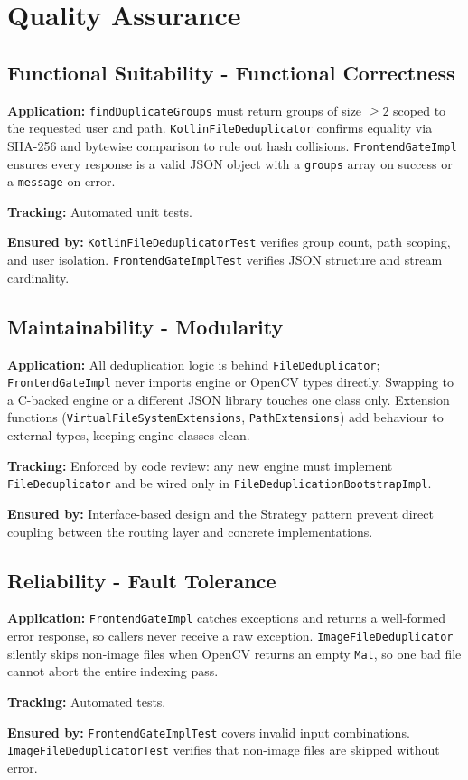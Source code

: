 \section{Quality Assurance}

\subsection{Functional Suitability - Functional Correctness}

\textbf{Application:}
\texttt{findDuplicateGroups} must return groups of size $\geq 2$ scoped to the requested user and path.
\texttt{KotlinFileDeduplicator} confirms equality via SHA-256 and bytewise comparison to rule out hash collisions.
\texttt{FrontendGateImpl} ensures every response is a valid JSON object with a \texttt{groups} array on success or a \texttt{message} on error.

\textbf{Tracking:} Automated unit tests.

\textbf{Ensured by:} \texttt{KotlinFileDeduplicatorTest} verifies group count, path scoping, and user isolation.
\texttt{FrontendGateImplTest} verifies JSON structure and stream cardinality.

\subsection{Maintainability - Modularity}

\textbf{Application:}
All deduplication logic is behind \texttt{FileDeduplicator}; \texttt{FrontendGateImpl} never imports engine or OpenCV types directly.
Swapping to a C-backed engine or a different JSON library touches one class only.
Extension functions (\texttt{VirtualFileSystemExtensions}, \texttt{PathExtensions}) add behaviour to external types, keeping engine classes clean.

\textbf{Tracking:} Enforced by code review: any new engine must implement \texttt{FileDeduplicator} and be wired only in \texttt{FileDeduplicationBootstrapImpl}.

\textbf{Ensured by:} Interface-based design and the Strategy pattern prevent direct coupling between the routing layer and concrete implementations.

\subsection{Reliability - Fault Tolerance}

\textbf{Application:}
\texttt{FrontendGateImpl} catches exceptions and returns a well-formed error response, so callers never receive a raw exception.
\texttt{ImageFileDeduplicator} silently skips non-image files when OpenCV returns an empty \texttt{Mat}, so one bad file cannot abort the entire indexing pass.

\textbf{Tracking:} Automated tests.

\textbf{Ensured by:} \texttt{FrontendGateImplTest} covers invalid input combinations.
\texttt{ImageFileDeduplicatorTest} verifies that non-image files are skipped without error.
